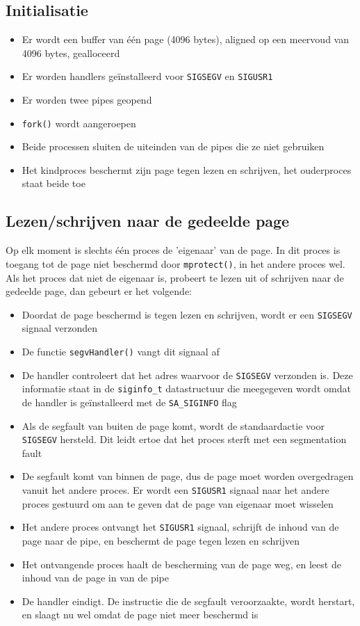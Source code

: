 \documentclass[11pt]{article}
\begin{document}
\subsection*{Initialisatie}
\begin{itemize}
\item Er wordt een buffer van \'e\'en page (4096 bytes), aligned op een meervoud van 4096 bytes, gealloceerd
\item Er worden handlers ge\"installeerd voor \verb+SIGSEGV+ en \verb+SIGUSR1+
\item Er worden twee pipes geopend
\item \verb+fork()+ wordt aangeroepen
\item Beide processen sluiten de uiteinden van de pipes die ze niet gebruiken
\item Het kindproces beschermt zijn page tegen lezen en schrijven, het ouderproces staat beide toe
\end{itemize}

\subsection*{Lezen/schrijven naar de gedeelde page}
Op elk moment is slechts \'e\'en proces de 'eigenaar' van de page. In dit proces is toegang
tot de page niet beschermd door \verb+mprotect()+, in het andere proces wel. Als het proces
dat niet de eigenaar is, probeert te lezen uit of schrijven naar de gedeelde page, dan gebeurt
er het volgende:
\begin{itemize}
\item Doordat de page beschermd is tegen lezen en schrijven, wordt er een \verb+SIGSEGV+ signaal verzonden
\item De functie \verb+segvHandler()+ vangt dit signaal af
\item De handler controleert dat het adres waarvoor de \verb+SIGSEGV+ verzonden is. Deze informatie staat in de \verb+siginfo_t+ datastructuur die meegegeven wordt omdat de handler is ge\"installeerd met de \verb+SA_SIGINFO+ flag
\item Als de segfault van buiten de page komt, wordt de standaardactie voor \verb+SIGSEGV+ hersteld. Dit leidt ertoe dat het proces sterft met een segmentation fault
\item De segfault komt van binnen de page, dus de page moet worden overgedragen vanuit het andere proces. Er wordt een \verb+SIGUSR1+ signaal naar het andere proces gestuurd om aan te geven dat de page van eigenaar moet wisselen
\item Het andere proces ontvangt het \verb+SIGUSR1+ signaal, schrijft de inhoud van de page naar de pipe, en beschermt de page tegen lezen en schrijven
\item Het ontvangende proces haalt de bescherming van de page weg, en leest de inhoud van de page in van de pipe
\item De handler eindigt. De instructie die de segfault veroorzaakte, wordt herstart, en slaagt nu wel omdat de page niet meer beschermd is
\end{itemize}
\end{document}
